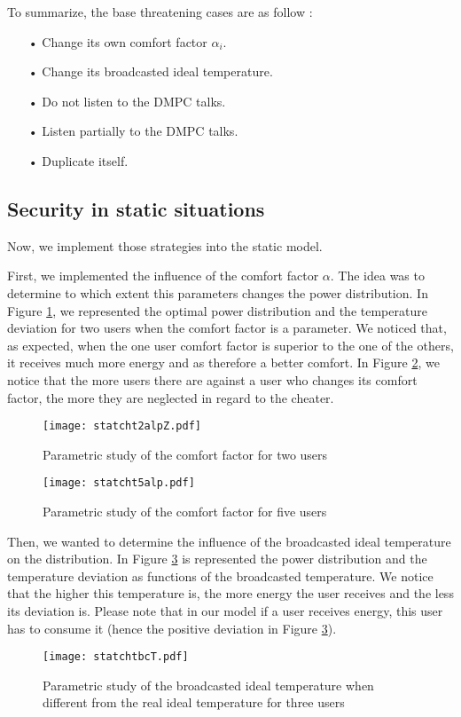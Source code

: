 \documentclass[conference, peerreview]{IEEEtran}
\begin{document}
To summarize, the base threatening cases are as follow : 
\begin{itemize}
\item[•] Change its own comfort factor $\alpha_i$.
\item[•] Change its broadcasted ideal temperature.
\item[•] Do not listen to the DMPC talks.
\item[•] Listen partially to the DMPC talks.
\item[•] Duplicate itself.
\end{itemize}

\subsection{Security in static situations}
Now, we implement those strategies into the static model. 

First, we implemented the influence of the comfort factor $\alpha$. The idea was to determine to which extent this parameters changes the power distribution. In Figure \ref{SCHT_a2}, we represented the optimal power distribution and the temperature deviation for two users when the comfort factor is a parameter. We noticed that, as expected, when the one user comfort factor is superior to the one of the others,  it receives much more energy and as therefore a better comfort. In Figure \ref{SCHT_a5}, we notice that the more users there are against a user who changes its comfort factor, the more they are neglected in regard to the cheater.

\begin{figure}[H]
\centering
\texttt{[image: statcht2alpZ.pdf]}
\caption{Parametric study of the comfort factor for two users}
\label{SCHT_a2}
\end{figure}

\begin{figure}[H]
\centering
\texttt{[image: statcht5alp.pdf]}
\caption{Parametric study of the comfort factor for five users}
\label{SCHT_a5}
\end{figure}

Then, we wanted to determine the influence of the broadcasted ideal temperature on the distribution. In Figure \ref{SCHT_T} is represented the power distribution and the temperature deviation as functions of the broadcasted temperature. We notice that the higher this temperature is, the more energy the user receives and the less its deviation is. Please note that in our model if a user receives energy, this user has to consume it (hence the positive deviation in Figure \ref{SCHT_T}).
\begin{figure}[H]
\centering
\texttt{[image: statchtbcT.pdf]}
\caption{Parametric study of the broadcasted ideal temperature when different from the real ideal temperature for three users}
\label{SCHT_T}
\end{figure}
\end{document}
